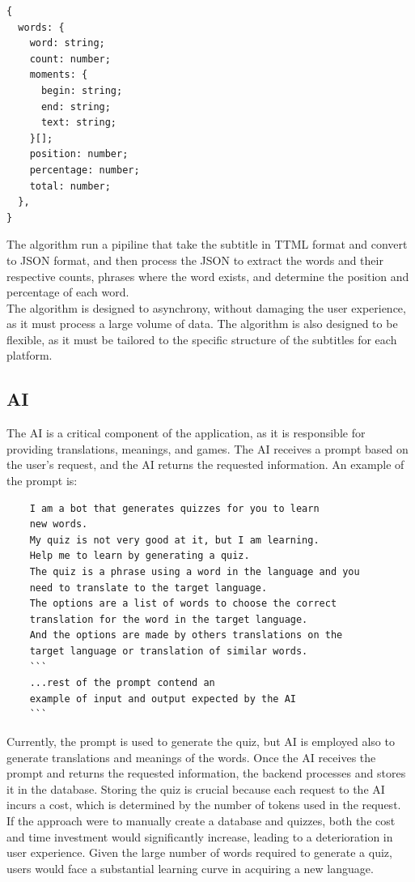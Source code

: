 \documentclass[12pt]{article}
\begin{document}
\begin{verbatim}
{
  words: {    
    word: string;
    count: number;
    moments: {
      begin: string;
      end: string;
      text: string;
    }[];
    position: number;
    percentage: number;
    total: number;
  },
}
\end{verbatim}
The algorithm run a pipiline that take the subtitle in TTML format and convert to JSON format, and then process the JSON to extract the words and their respective counts, phrases where the word exists, and determine the position and percentage of each word. \\
The algorithm is designed to asynchrony, without damaging the user experience, as it must process a large volume of data. The algorithm is also designed to be flexible, as it must be tailored to the specific structure of the subtitles for each platform. 
\subsection{AI}
  The AI is a critical component of the application, as it is responsible for providing translations, meanings, and games. The AI receives a prompt based on the user's request, and the AI returns the requested information. 
  An example of the prompt is: \\
  \begin{verbatim}
    I am a bot that generates quizzes for you to learn 
    new words. 
    My quiz is not very good at it, but I am learning.
    Help me to learn by generating a quiz.
    The quiz is a phrase using a word in the language and you 
    need to translate to the target language.
    The options are a list of words to choose the correct 
    translation for the word in the target language. 
    And the options are made by others translations on the 
    target language or translation of similar words.
    ```
    ...rest of the prompt contend an 
    example of input and output expected by the AI
    ```
  \end{verbatim}
  Currently, the prompt is used to generate the quiz, but AI is employed also to generate translations and meanings of the words. Once the AI receives the prompt and returns the requested information, the backend processes and stores it in the database. Storing the quiz is crucial because each request to the AI incurs a cost, which is determined by the number of tokens used in the request. \\
  If the approach were to manually create a database and quizzes, both the cost and time investment would significantly increase, leading to a deterioration in user experience. Given the large number of words required to generate a quiz, users would face a substantial learning curve in acquiring a new language.
\end{document}
